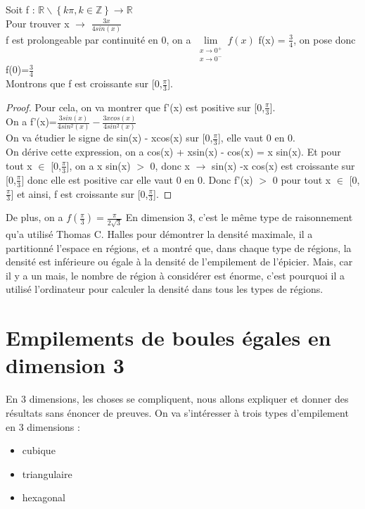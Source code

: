 \documentclass{book}
\newtheorem{proof}{Preuve}
\begin{document}
{\noindent Soit f : $\mathbb{R}\backslash \left\{  k\pi, k \in \mathbb{Z} \right\} \rightarrow \mathbb{R}$}\\

Pour trouver
\tabto{3cm} x $\longrightarrow$ $\frac{3x}{4sin(x)}$\\
f est prolongeable par continuité en 0, on a $\lim\limits_{\substack{x \rightarrow 0^+ \\ x \rightarrow 0^-}} f(x)$ f(x) = $\frac{3}{4}$, on pose donc f(0)=$\frac{3}{4}$\\
Montrons que f est croissante sur [0,$\frac{\pi}{3}$]. 

\begin{proof}
Pour cela, on va montrer que f'(x) est positive sur [0,$\frac{\pi}{3}$].\\
On a f'(x)=$\frac{3sin(x)}{4sin^2(x)}-\frac{3xcos(x)}{4sin^2(x)}$\\
On va étudier le signe de sin(x) - xcos(x) sur [0,$\frac{\pi}{3}$], elle vaut 0 en 0.\\
On dérive cette expression, on a cos(x) + xsin(x) - cos(x) = x sin(x). Et pour tout x $\in$ [0,$\frac{\pi}{3}$], on a x sin(x) $>$ 0, donc x $\rightarrow$ sin(x) -x cos(x) est croissante sur [0,$\frac{\pi}{3}$] donc elle est positive car elle vaut 0 en 0. Donc f'(x) $>$ 0 pour tout x $\in$ [0,$\frac{\pi}{3}$] et ainsi, f est croissante sur [0,$\frac{\pi}{3}$].
\end{proof}
{\noindent De plus}, on a $f(\frac{\pi}{3}) = \frac{\pi}{2 \sqrt{3}}$
{\noindent En dimension 3,} c'est le même type de raisonnement qu'a utilisé Thomas C. Halles pour démontrer la densité maximale, il a partitionné l'espace en régions, et a montré que, dans chaque type de régions, la densité est inférieure ou égale à la densité de l'empilement de l'épicier. Mais, car il y a un mais, le nombre de région à considérer est énorme, c'est pourquoi il a utilisé l'ordinateur pour calculer la densité dans tous les types de régions.

\section{Empilements de boules égales en dimension 3}
En 3 dimensions, les choses se compliquent, nous allons expliquer et donner des résultats sans énoncer de preuves.
On va s'intéresser à trois types d'empilement en 3 dimensions :
\begin{itemize}
    \item cubique
    \item triangulaire
    \item hexagonal
\end{itemize}
\end{document}
